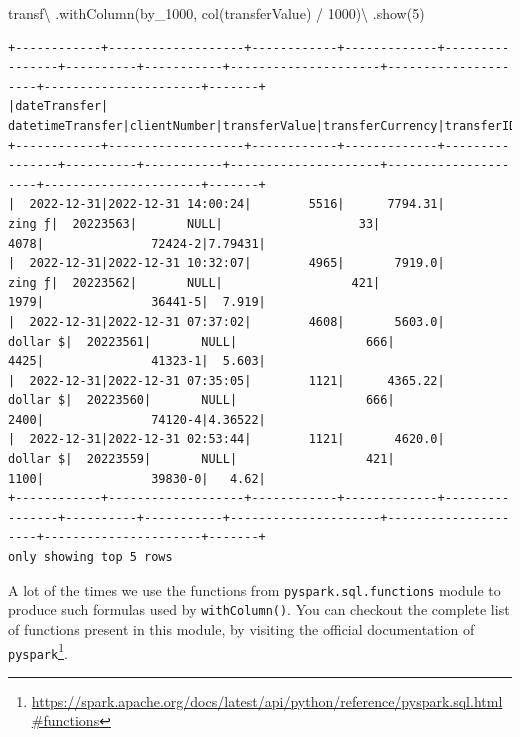\documentclass[
  11pt,
  letterpaper,
  DIV=11,
  numbers=noendperiod]{scrreprt}
\newenvironment{Shaded}{\begin{snugshade}}{\end{snugshade}}
\newcommand{\DecValTok}[1]{\textcolor[rgb]{0.68,0.00,0.00}{#1}}
\newcommand{\NormalTok}[1]{\textcolor[rgb]{0.00,0.23,0.31}{#1}}
\newcommand{\OperatorTok}[1]{\textcolor[rgb]{0.37,0.37,0.37}{#1}}
\newcommand{\StringTok}[1]{\textcolor[rgb]{0.13,0.47,0.30}{#1}}
\begin{document}
\begin{Shaded}
\begin{Highlighting}[]
\NormalTok{transf}\OperatorTok{\textbackslash{}}
\NormalTok{  .withColumn(}\StringTok{\textquotesingle{}by\_1000\textquotesingle{}}\NormalTok{, col(}\StringTok{\textquotesingle{}transferValue\textquotesingle{}}\NormalTok{) }\OperatorTok{/} \DecValTok{1000}\NormalTok{)}\OperatorTok{\textbackslash{}}
\NormalTok{  .show(}\DecValTok{5}\NormalTok{)}
\end{Highlighting}
\end{Shaded}

\begin{verbatim}
+------------+-------------------+------------+-------------+----------------+----------+-----------+---------------------+---------------------+----------------------+-------+
|dateTransfer|   datetimeTransfer|clientNumber|transferValue|transferCurrency|transferID|transferLog|destinationBankNumber|destinationBankBranch|destinationBankAccount|by_1000|
+------------+-------------------+------------+-------------+----------------+----------+-----------+---------------------+---------------------+----------------------+-------+
|  2022-12-31|2022-12-31 14:00:24|        5516|      7794.31|          zing ƒ|  20223563|       NULL|                   33|                 4078|               72424-2|7.79431|
|  2022-12-31|2022-12-31 10:32:07|        4965|       7919.0|          zing ƒ|  20223562|       NULL|                  421|                 1979|               36441-5|  7.919|
|  2022-12-31|2022-12-31 07:37:02|        4608|       5603.0|        dollar $|  20223561|       NULL|                  666|                 4425|               41323-1|  5.603|
|  2022-12-31|2022-12-31 07:35:05|        1121|      4365.22|        dollar $|  20223560|       NULL|                  666|                 2400|               74120-4|4.36522|
|  2022-12-31|2022-12-31 02:53:44|        1121|       4620.0|        dollar $|  20223559|       NULL|                  421|                 1100|               39830-0|   4.62|
+------------+-------------------+------------+-------------+----------------+----------+-----------+---------------------+---------------------+----------------------+-------+
only showing top 5 rows
\end{verbatim}

A lot of the times we use the functions from
\texttt{pyspark.sql.functions} module to produce such formulas used by
\texttt{withColumn()}. You can checkout the complete list of functions
present in this module, by visiting the official documentation of
\texttt{pyspark}\footnote{\url{https://spark.apache.org/docs/latest/api/python/reference/pyspark.sql.html\#functions}}.
\end{document}

